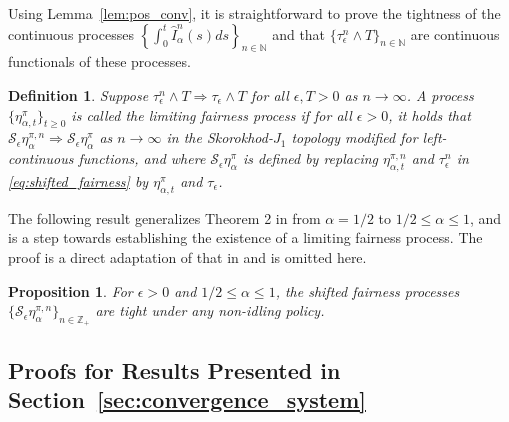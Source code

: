 \documentclass[a4paper,11pt,twoside]{article}
\numberwithin{equation}{section}
\numberwithin{figure}{section}
\theoremstyle{plain}
\newtheorem{proposition}[theorem]{Proposition}
\newtheorem{definition}[theorem]{Definition}
\newcommand{\cS}{\mathcal{S}}
\newcommand{\NN}{\mathbb{N}}
\newcommand{\ZZ}{\mathbb{Z}}
\newcommand{\1}{\mathbbm{1}}
\newcommand{\toP}{\stackrel{p}{\rightarrow}}
\begin{document}
Using Lemma~\ref{lem:pos_conv}, it is straightforward to prove the tightness of the continuous processes $\left\{\int_0^t\hat{I}_\alpha^n(s)ds\right\}_{n\in \NN}$ and that $\{\tau_\epsilon^n\wedge T\}_{n\in \NN}$ are continuous functionals of these processes. 

\begin{definition}
Suppose $\tau_\epsilon^n \wedge T\Rightarrow \tau_\epsilon \wedge T$ for all $\epsilon,T>0$ as $n\to \infty$. A process $\{\eta_{\alpha,t}^\pi\}_{t\geq 0}$ is called the limiting fairness process if for all $\epsilon>0$, it holds that  $\cS_\epsilon\eta_{\alpha}^{\pi,n}\Rightarrow \cS_\epsilon\eta_{\alpha}^\pi$ as $n\to \infty$ in the Skorokhod-$J_1$ topology modified for left-continuous functions, and where $\cS_\epsilon\eta_{\alpha}^\pi$ is defined by replacing $\eta_{\alpha,t}^{\pi,n}$ and $\tau_\epsilon^n$ in \eqref{eq:shifted_fairness} by $\eta_{\alpha,t}^\pi$ and $\tau_\epsilon$. \label{def:limitingfairness}
\end{definition}
The following result generalizes Theorem 2 in \cite{bukeqin2019} from $\alpha=1/2$ to  $1/2\leq\alpha\leq 1$, and is a step towards establishing the existence of a limiting fairness process. The proof is a direct adaptation of that in \cite{bukeqin2019} and is omitted here. 
\begin{proposition}
For $\epsilon>0$ and $1/2\leq \alpha\leq 1$, the shifted fairness processes $\{\cS_\epsilon\eta_\alpha^{\pi,n}\}_{n\in\ZZ_+}$ are tight under any non-idling policy.\label{prop:tightness_fairness}
\end{proposition}

 




\subsection{Proofs for Results Presented in Section~\ref{sec:convergence_system}}\label{app:convergence_system}
\end{document}
